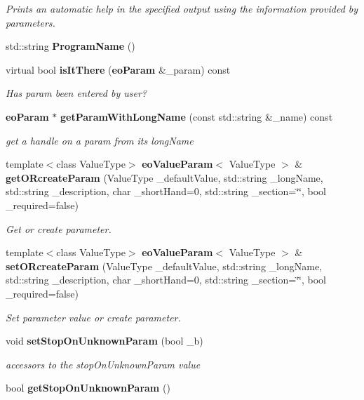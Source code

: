 \begin{CompactItemize}
\begin{CompactList}\small\item\em Prints an automatic help in the specified output using the information provided by parameters. \item\end{CompactList}\item 
std::string {\bf Program\-Name} ()\label{classeo_parser_a7}

\item 
virtual bool {\bf is\-It\-There} ({\bf eo\-Param} \&\_\-param) const 
\begin{CompactList}\small\item\em Has param been entered by user? \item\end{CompactList}\item 
{\bf eo\-Param} $\ast$ {\bf get\-Param\-With\-Long\-Name} (const std::string \&\_\-name) const 
\begin{CompactList}\small\item\em get a handle on a param from its long\-Name \item\end{CompactList}\item 
template$<$class Value\-Type$>$ {\bf eo\-Value\-Param}$<$ Value\-Type $>$ \& {\bf get\-ORcreate\-Param} (Value\-Type \_\-default\-Value, std::string \_\-long\-Name, std::string \_\-description, char \_\-short\-Hand=0, std::string \_\-section=\char`\"{}\char`\"{}, bool \_\-required=false)
\begin{CompactList}\small\item\em Get or create parameter. \item\end{CompactList}\item 
template$<$class Value\-Type$>$ {\bf eo\-Value\-Param}$<$ Value\-Type $>$ \& {\bf set\-ORcreate\-Param} (Value\-Type \_\-default\-Value, std::string \_\-long\-Name, std::string \_\-description, char \_\-short\-Hand=0, std::string \_\-section=\char`\"{}\char`\"{}, bool \_\-required=false)
\begin{CompactList}\small\item\em Set parameter value or create parameter. \item\end{CompactList}\item 
void {\bf set\-Stop\-On\-Unknown\-Param} (bool \_\-b)\label{classeo_parser_a12}

\begin{CompactList}\small\item\em accessors to the stop\-On\-Unknown\-Param value \item\end{CompactList}\item 
bool {\bf get\-Stop\-On\-Unknown\-Param} ()\label{classeo_parser_a13}


\end{CompactItemize}
